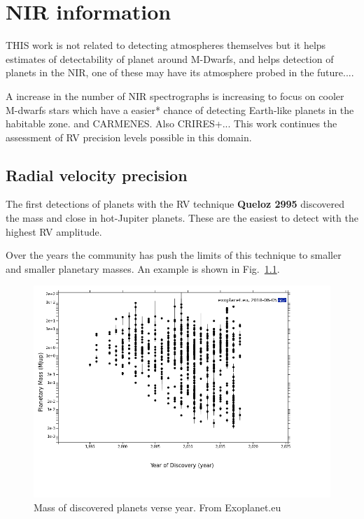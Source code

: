 
\chapter{NIR information}  %

\label{cha:nir_content}


THIS work is not related to detecting atmospheres themselves but it helps estimates of  detectability of planet around M-Dwarfs, and helps detection of planets in the NIR, one of these may have its atmosphere probed in the future....

A increase in the  number of NIR spectrographs is increasing to focus on cooler M-dwarfs stars which have a easier* chance of detecting Earth-like planets in the habitable zone.  and CARMENES. Also CRIRES+... 
This work continues the assessment of RV precision levels possible in this domain. 


\section{Radial velocity precision}
The first detections of planets with the RV technique \textbf{Queloz 2995} discovered the mass and close in hot-Jupiter planets. These are the easiest to detect with the highest RV amplitude.

Over the years the community has push the limits of this technique to smaller and smaller planetary masses. An example is shown in Fig.~\ref{fig:year_mass}. 
\begin{figure}

\includegraphics[width=0.8\linewidth]{figures/year_planet_mass.png}
\caption{Mass of discovered planets verse year. From Exoplanet.eu}
\label{fig:year_mass}
\end{figure}


